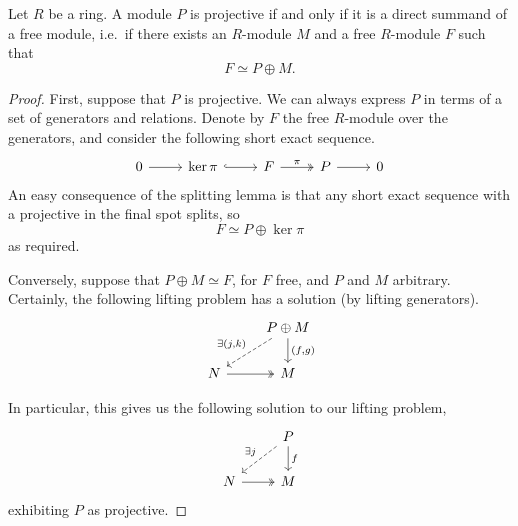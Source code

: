 \documentclass[main.tex]{subfiles}
\begin{document}
\begin{proposition}
  \label{prop:projectives_are_direct_summands_of_free}
  Let $R$ be a ring. A module $P$ is projective if and only if it is a direct summand of a free module, i.e.\ if there exists an $R$-module $M$ and a free $R$-module $F$ such that
  \begin{equation*}
    F \simeq P \oplus M.
  \end{equation*}
\end{proposition}
\begin{proof}
  First, suppose that $P$ is projective. We can always express $P$ in terms of a set of generators and relations. Denote by $F$ the free $R$-module over the generators, and consider the following short exact sequence.
  \begin{equation*}
    \begin{tikzcd}
      0
      \arrow[r]
      & \ker \pi
      \arrow[r, hookrightarrow]
      & F
      \arrow[r, twoheadrightarrow, "\pi"]
      & P
      \arrow[r]
      & 0
    \end{tikzcd}
  \end{equation*}
  An easy consequence of the splitting lemma is that any short exact sequence with a projective in the final spot splits, so
  \begin{equation*}
    F \simeq P \oplus \ker \pi
  \end{equation*}
  as required.

  Conversely, suppose that $P \oplus M \simeq F$, for $F$ free, and $P$ and $M$ arbitrary. Certainly, the following lifting problem has a solution (by lifting generators).
  \begin{equation*}
    \begin{tikzcd}
      & P \oplus M
      \arrow[d, "{(f, g)}"]
      \arrow[dl, dashed, swap, "\exists {(j, k)}"]
      \\
      N
      \arrow[r, twoheadrightarrow]
      & M
    \end{tikzcd}
  \end{equation*}

  In particular, this gives us the following solution to our lifting problem,
  \begin{equation*}
    \begin{tikzcd}
      & P
      \arrow[d, "f"]
      \arrow[dl, dashed, swap, "\exists j"]
      \\
      N
      \arrow[r, twoheadrightarrow]
      & M
    \end{tikzcd}
  \end{equation*}
  exhibiting $P$ as projective.
\end{proof}
\end{document}
